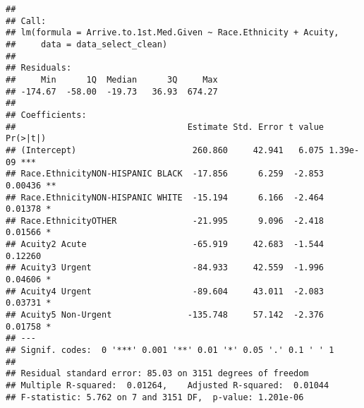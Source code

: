\documentclass[]{article}
\begin{document}
\begin{verbatim}
## 
## Call:
## lm(formula = Arrive.to.1st.Med.Given ~ Race.Ethnicity + Acuity, 
##     data = data_select_clean)
## 
## Residuals:
##     Min      1Q  Median      3Q     Max 
## -174.67  -58.00  -19.73   36.93  674.27 
## 
## Coefficients:
##                                  Estimate Std. Error t value Pr(>|t|)    
## (Intercept)                       260.860     42.941   6.075 1.39e-09 ***
## Race.EthnicityNON-HISPANIC BLACK  -17.856      6.259  -2.853  0.00436 ** 
## Race.EthnicityNON-HISPANIC WHITE  -15.194      6.166  -2.464  0.01378 *  
## Race.EthnicityOTHER               -21.995      9.096  -2.418  0.01566 *  
## Acuity2 Acute                     -65.919     42.683  -1.544  0.12260    
## Acuity3 Urgent                    -84.933     42.559  -1.996  0.04606 *  
## Acuity4 Urgent                    -89.604     43.011  -2.083  0.03731 *  
## Acuity5 Non-Urgent               -135.748     57.142  -2.376  0.01758 *  
## ---
## Signif. codes:  0 '***' 0.001 '**' 0.01 '*' 0.05 '.' 0.1 ' ' 1
## 
## Residual standard error: 85.03 on 3151 degrees of freedom
## Multiple R-squared:  0.01264,    Adjusted R-squared:  0.01044 
## F-statistic: 5.762 on 7 and 3151 DF,  p-value: 1.201e-06
\end{verbatim}
\end{document}
